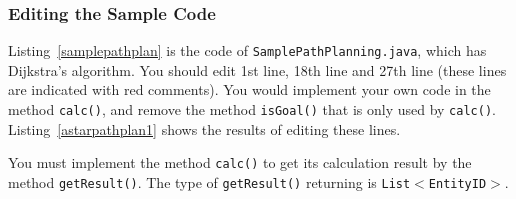 \documentclass{article}
\begin{document}
\subsubsection{Editing the Sample Code}
Listing~\ref{samplepathplan} is the code of \texttt{SamplePathPlanning.java},
which has Dijkstra's algorithm. You should edit 1st line, 18th line and 27th line (these lines are indicated with red comments). You would implement your own code in the method \texttt{calc()}, and remove the method \texttt{isGoal()} that is only used by \texttt{calc()}. Listing~\ref{astarpathplan1} shows the results of editing these lines.

You must implement the method \texttt{calc()} to get its calculation result
by the method \texttt{getResult()}. The type of \texttt{getResult()} returning is \texttt{List$<$EntityID$>$}.
\end{document}
